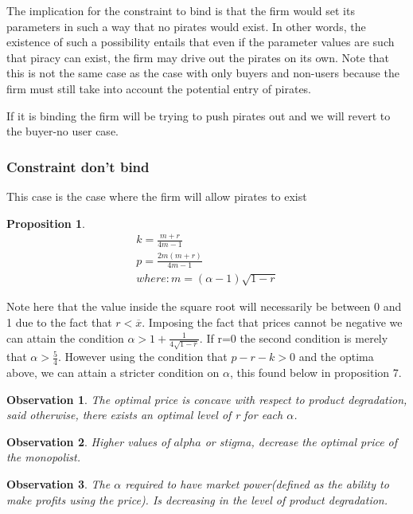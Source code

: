 \documentclass{article}
\newtheorem{proposition}{Proposition}
\newtheorem{observation}{Observation}
\begin{document}
The implication for the constraint to bind is that the firm would set its parameters in such a way that no pirates would exist. In other words, the existence of such a possibility entails that even if the parameter values are such that piracy can exist, the firm may drive out the pirates on its own. Note that this is not the same case as the case with only buyers and non-users because the firm must still take into account the potential entry of pirates. 

If it is binding the firm will be trying to push pirates out and we will revert to the buyer-no user case. 


\subsubsection{Constraint don't bind}

This case is the case where the firm will allow pirates to exist 

\begin{proposition}
\begin{equation}\label{TNB}
\begin{array}{ll}
k = \frac{m+r}{4m-1} \\
p = \frac{2m(m+r)}{4m-1} \\
where: m = (\alpha-1)\sqrt{1-r}
\end{array}
\end{equation}
\end{proposition}

Note here that the value inside the square root will necessarily be between 0 and 1 due to the fact that $r<\overline{x}$. Imposing the fact that prices cannot be negative we can attain the condition  $\alpha>1+\frac{1}{4\sqrt{1-r}}$. If r=0 the second condition is merely that $\alpha>\frac{5}{4}$. However using the condition that $p-r-k>0$ and the optima above, we can attain a stricter condition on $\alpha$, this found below in proposition 7. 

\begin{observation}
The optimal price is concave with respect to product degradation, said otherwise, there exists an optimal level of r for each $\alpha$. 
\end{observation}

\begin{observation}
Higher values of $alpha$ or stigma, decrease the optimal price of the monopolist. 
\end{observation}

\begin{observation}
The $\alpha$ required to have market power(defined as the ability to make profits using the price). Is decreasing in the level of product degradation. 
\end{observation}
\end{document}
